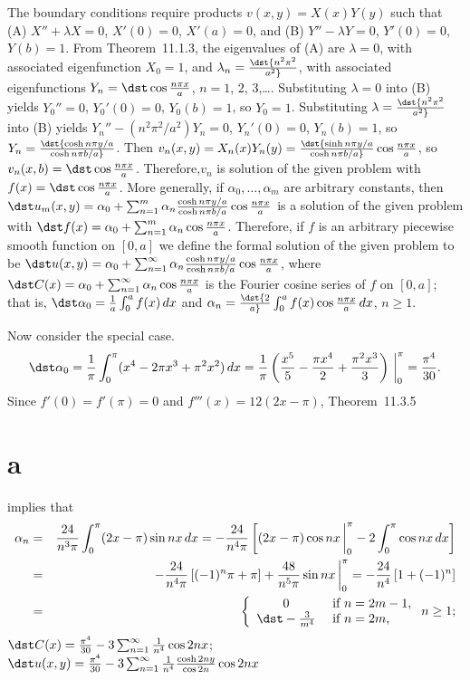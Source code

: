 \documentclass[dvips]{book}
\renewcommand{\exer}[1]{\par\medskip\;\noindent{\color{red}\bf #1.}}
\numberwithin{example}{section}
\numberwithin{equation}{section}
\numberwithin{theorem}{section}
\numberwithin{table}{section}
\numberwithin{figure}{section}
\newcommand{\lims}[2]{\,\bigg|_{#1}^{#2}}
\begin{document}
\exer{12.3.22}
The boundary conditions require products $v(x,y)=X(x)Y(y)$
such that
(A)  $X''+\lambda X=0$, $X'(0)=0$, $X'(a)=0$, and
(B)  $Y''-\lambda Y=0$, $Y'(0)=0$, $Y(b)=1$.
From Theorem~11.1.3, the eigenvalues of (A) are
$\lambda=0$, with associated eigenfunction $X_0=1$, and
$\lambda_n=\dst{n^2\pi^2\over a^2}$, with associated eigenfunctions
$Y_n=\dst\cos{n\pi x\over a}$, $n=1$, $2$, $3$,\dots.
Substituting $\lambda=0$ into (B) yields $Y_0''=0$,
$Y_0'(0)=0$, $Y_0(b)=1$,
so $Y_0=1$.
Substituting $\lambda=\dst{n^2\pi^2\over a^2}$  into (B) yields
$Y_n''-({n^2\pi^2/a^2})Y_n=0$, $Y_n'(0)=0$,  $Y_n(b)=1$, so
$Y_n=\dst{\cosh n\pi y/a\over \cosh n\pi b/a}$. Then
$v_n(x,y)=X_n(x)Y_n(y)=
\dst{\sinh n\pi y/a\over\cosh n\pi
b/a}\cos{n\pi x\over a}$, so
$v_n(x,b)=\dst\cos{n\pi x\over a}$.
Therefore,$v_n$ is solution of the given problem  with
$f(x)=\dst\cos{n\pi x\over a}$. More generally,
 if $\alpha_0,\dots,\alpha_m$ are arbitrary constants,
then
$\dst u_m(x,y)=\alpha_0+\sum_{n=1}^m\alpha_n{\cosh n\pi y/a
\over\cosh n\pi b/a}\cos
{n\pi x\over a}$
 is a solution of the given problem with
$\dst f(x)=\alpha_0+\sum_{n=1}^m\alpha_n\cos{n\pi x\over a}$.
Therefore, if $f$ is an arbitrary piecewise smooth function on
$[0,a]$  we define the formal solution of the given problem  to be
$\dst u(x,y)=\alpha_0+\sum_{n=1}^\infty\alpha_n{\cosh n\pi y/a
\over\cosh n\pi b/a}\cos
{n\pi x\over a}$,
where
$\dst C(x)=\alpha_0+\sum_{n=1}^\infty \alpha_n\cos{n\pi x\over a}$
is the Fourier  cosine series of $f$ on $[0,a]$; that is,
$\dst\alpha_0={1\over a}\int_0^a f(x)\,dx$ and
$\alpha_n=\dst{2\over a}\int_0^a f(x)\cos
{n\pi x\over a}\,dx$, $n\ge1$.

Now consider the special case.
$$
\dst \alpha_0={1\over \pi}\int_0^\pi(x^4-2\pi x^3+\pi^2x^2)\,dx={1\over
\pi}\left({x^5\over5}-{\pi x^4\over2}+{\pi^2x^3\over3}
\right)\lims0\pi={\pi^4\over30}.
$$
Since  $f'(0)=f'(\pi)=0$ and  $f'''(x)=12(2x-\pi)$,
Theorem~11.3.5\part{a} implies that
\begin{eqnarray*}
\alpha_n&=&
{24\over n^3\pi}\int_0^\pi(2x-\pi)\sin nx\,dx
=-{24\over n^4\pi}\left[(2x-\pi)\cos nx\lims0\pi
-2\int_0^\pi\cos nx\,dx\right]\\
&=&-{24\over n^4\pi}\left[(-1)^n\pi+\pi\right]+
{48\over n^5\pi}\sin nx\lims0\pi=
-{24\over n^4}\left[1+(-1)^n\right]\\
&=&
\left\{\begin{array}{cl}
0&\mbox{ if }n=2m-1,\\
\dst-{3\over m^4}&\mbox{ if }n=2m,
\end{array}\right.
n\ge1;
\end{eqnarray*}
$\dst C(x)={\pi^4\over30}-3\sum_{n=1}^\infty{1\over
n^4}\cos 2nx$;
$\dst u(x,y)={\pi^4\over30}-3\sum_{n=1}^\infty{1\over
n^4}{\cosh2ny\over\cos2n}\cos 2nx$
\end{document}
